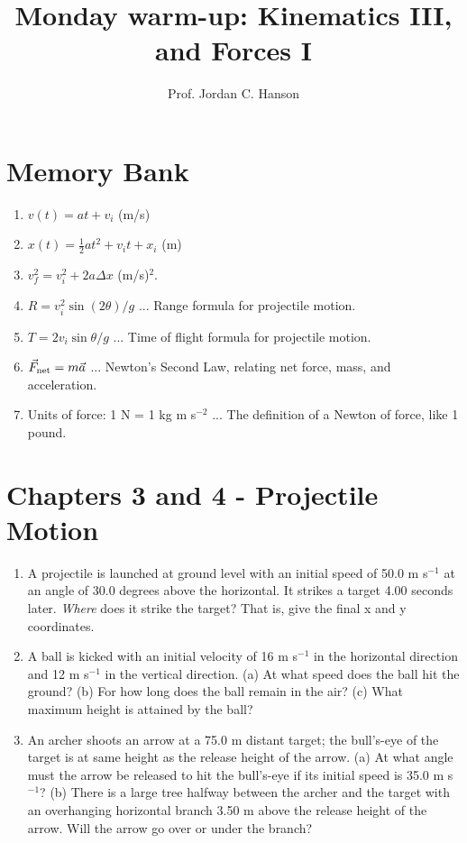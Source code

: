 \documentclass{article}
\begin{document}
\twocolumn

\title{Monday warm-up: Kinematics III, and Forces I}
\author{Prof. Jordan C. Hanson}

\maketitle

\section{Memory Bank}

\begin{enumerate}
\item $v(t) = at + v_{i}$ (m/s)
\item $x(t) = \frac{1}{2}at^2 + v_{i} t + x_{i}$ (m)
\item $v_f^2 = v_i^2 + 2a\Delta x$ (m/s)$^2$.
\item $R = v_i^2 \sin(2\theta)/g$ ... Range formula for projectile motion.
\item $T = 2v_i\sin\theta/g$ ... Time of flight formula for projectile motion.
\item $\vec{F}_{\rm net} = m \vec{a}$ ... Newton's Second Law, relating net force, mass, and acceleration.
\item Units of force: 1 N = 1 kg m s$^{-2}$ ... The definition of a Newton of force, like 1 pound.
\end{enumerate}

\section{Chapters 3 and 4 - Projectile Motion}

\begin{enumerate}
\item A projectile is launched at ground level with an initial speed of 50.0 m s$^{-1}$ at an angle of 30.0 degrees above the horizontal. It strikes a target 4.00 seconds later.  \textit{Where} does it strike the target?  That is, give the final x and y coordinates. \\ \vspace{3cm}
\item A ball is kicked with an initial velocity of 16 m s$^{-1}$ in the horizontal direction and 12 m s$^{-1}$ in the vertical direction. (a) At what speed does the ball hit the ground? (b) For how long does the ball remain in the air? (c) What maximum height is attained by the ball? \\ \vspace{3cm}
\item An archer shoots an arrow at a 75.0 m distant target; the bull's-eye of the target is at same height as the release height of the arrow. (a) At what angle must the arrow be released to hit the bull’s-eye if its initial speed is 35.0 m s$^{-1}$? (b) There is a large tree halfway between the archer and the target with an overhanging horizontal branch 3.50 m above the release height of the arrow. Will the arrow go over or under the branch? \\ \vspace{3cm}
\end{enumerate}
\end{document}
